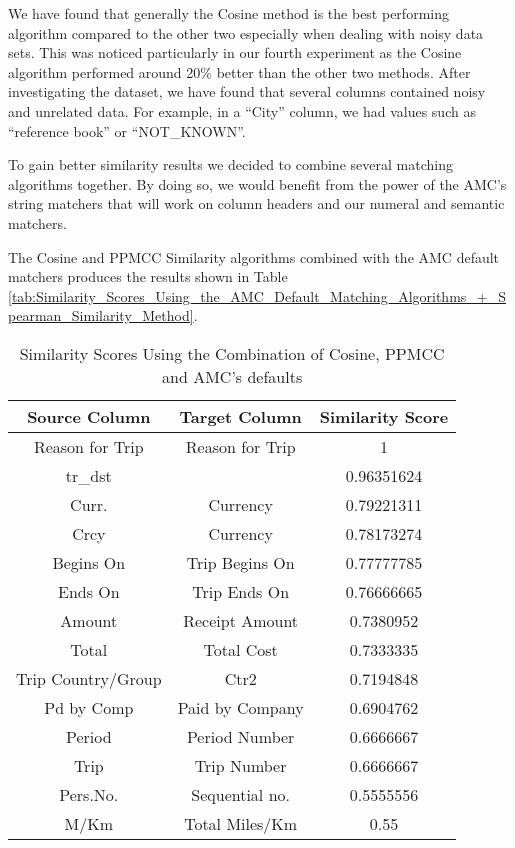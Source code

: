 We have found that generally the Cosine method is the best performing algorithm compared to the other two especially when dealing with noisy data sets. This was noticed particularly in our fourth experiment as the Cosine algorithm performed around 20\% better than the other two methods. After investigating the dataset, we have found that several columns contained noisy and unrelated data. For example, in a ``City'' column, we had values such as ``reference book'' or ``NOT\_KNOWN''.

To gain better similarity results we decided to combine several matching algorithms together. By doing so, we would benefit from the power of the AMC's string matchers that will work on column headers and our numeral and semantic matchers.

The Cosine and PPMCC Similarity algorithms combined with the AMC default matchers produces the results shown in Table \ref{tab:Similarity_Scores_Using_the_AMC_Default_Matching_Algorithms_+_Spearman_Similarity_Method}.

\begin{table}[ht]
\centering
\begin{tabular}{|c|c|c|} \hline
\textbf{Source Column} & \textbf{Target Column} & \textbf{Similarity Score} \\ \hline
Reason for Trip & Reason for Trip & 1 \\ \hline
tr\_dst &  & 0.96351624 \\ \hline
Curr. & Currency & 0.79221311 \\ \hline
Crcy & Currency & 0.78173274 \\ \hline
Begins On & Trip Begins On & 0.77777785 \\ \hline
Ends On & Trip Ends On & 0.76666665 \\ \hline
Amount & Receipt Amount & 0.7380952 \\ \hline
Total & Total Cost & 0.7333335 \\ \hline
Trip Country/Group & Ctr2 & 0.7194848 \\ \hline
Pd by Comp & Paid by Company & 0.6904762 \\ \hline
Period & Period Number & 0.6666667 \\ \hline
Trip & Trip Number & 0.6666667 \\ \hline
Pers.No. & Sequential no. & 0.5555556 \\ \hline
M/Km & Total Miles/Km & 0.55 \\ \hline
\end{tabular}
\caption{Similarity Scores Using the Combination of Cosine, PPMCC and AMC's defaults}
\label{tab:Similarity_Scores_Using_the_Combination_of_Cosine,_PPMCC_and_AMC's_defaults}
\end{table}

